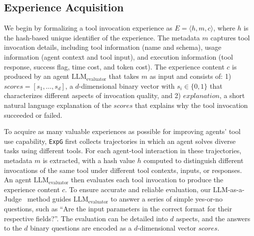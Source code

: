 \documentclass[11pt]{article}
\newcommand{\ours}{\texttt{ExpG}}
\begin{document}
\subsection{Experience Acquisition}
We begin by formalizing a tool invocation experience as $E=\langle h,m,c\rangle$, where $h$ is the hash-based unique identifier of the experience. The metadata $m$ captures tool invocation details, including tool information (name and schema), usage information (agent context and tool input), and execution information (tool response, success flag, time cost, and token cost). The experience content $c$ is produced by an agent $\mathrm{LLM}_{\mathrm{evaluator}}$ that takes $m$ as input and consists of: 1) $scores=[s_1,\ldots,s_{d}]$, a $d$-dimensional binary vector with $s_i\in\{0,1\}$ that characterizes different aspects of invocation quality, and 2) $explanation$, a short natural language explanation of the $scores$ that explains why the tool invocation succeeded or failed. 

To acquire as many valuable experiences as possible for improving agents' tool use capability, {\ours} first collects trajectories in which an agent solves diverse tasks using different tools. For each agent-tool interaction in these trajectories, metadata $m$ is extracted, with a hash value $h$ computed to distinguish different invocations of the same tool under different tool contexts, inputs, or responses. An agent $\mathrm{LLM}_{\mathrm{evaluator}}$ then evaluates each tool invocation to produce the experience content $c$. 
To ensure accurate and reliable evaluation, our LLM-as-a-Judge~\citep{zheng2023judging} method guides $\mathrm{LLM}_{\mathrm{evaluator}}$ to answer a series of simple yes-or-no questions, such as ``Are the input parameters in the correct format for their respective fields?''. 
The evaluation can be detailed into $d$ aspects, and the answers to the $d$ binary questions are encoded as a $d$-dimensional vector $scores$. 
\end{document}
